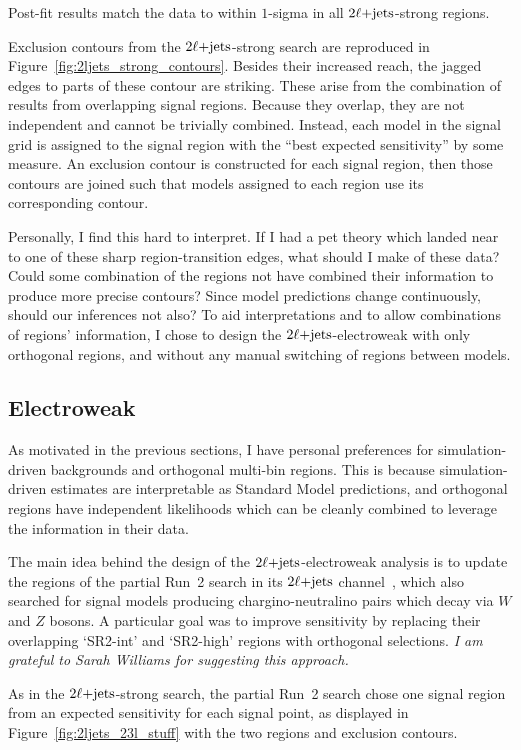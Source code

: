 Post-fit results match the data to within $1$-sigma in all $2\ell\mathrm{+jets}$-strong
regions.

Exclusion contours from the $2\ell\mathrm{+jets}$-strong search are reproduced in
Figure~\ref{fig:2ljets_strong_contours}.
Besides their increased reach, the jagged edges to parts of these contour are
striking.
These arise from the combination of results from overlapping signal regions.
Because they overlap, they are not independent and cannot be trivially
combined.
Instead, each model in the signal grid is assigned to the signal region
with the ``best expected sensitivity'' by some measure.
An exclusion contour is constructed for each signal region, then those contours
are joined such that models assigned to each region use its corresponding
contour.

Personally, I find this hard to interpret.
If I had a pet theory which landed near to one of these sharp
region-transition edges, what should I make of these data?
Could some combination of the regions not have combined their information to
produce more precise contours?
Since model predictions change continuously, should our inferences not also?
To aid interpretations and to allow combinations of regions'
information, I chose to design the $2\ell\mathrm{+jets}$-electroweak with only orthogonal
regions, and without any manual switching of regions between models.


\FloatBarrier
\subsection{Electroweak}
\label{sec:2ljets_origins_electroweak}
As motivated in the previous sections, I have personal preferences for
simulation-driven backgrounds and orthogonal multi-bin regions.
This is because simulation-driven estimates are interpretable as
Standard Model predictions,
and orthogonal regions have independent likelihoods which can be cleanly
combined to leverage the information in their data.

The main idea behind the design of the $2\ell\mathrm{+jets}$-electroweak analysis is to
update the regions of the partial Run~2 search in its $2\ell\mathrm{+jets}$
channel~\cite{atlas_23l_SUSY_2016_24}, which also searched for signal models
producing chargino-neutralino pairs which decay via $W$ and $Z$ bosons.
A particular goal was to improve sensitivity by replacing their overlapping
`SR2-int' and `SR2-high' regions with orthogonal selections.
\emph{I am grateful to Sarah Williams for suggesting this approach.}

As in the $2\ell\mathrm{+jets}$-strong search, the partial Run~2 search chose one
signal region from an expected sensitivity for each signal point,
as displayed in
Figure~\ref{fig:2ljets_23l_stuff}
with the two regions and exclusion contours.

